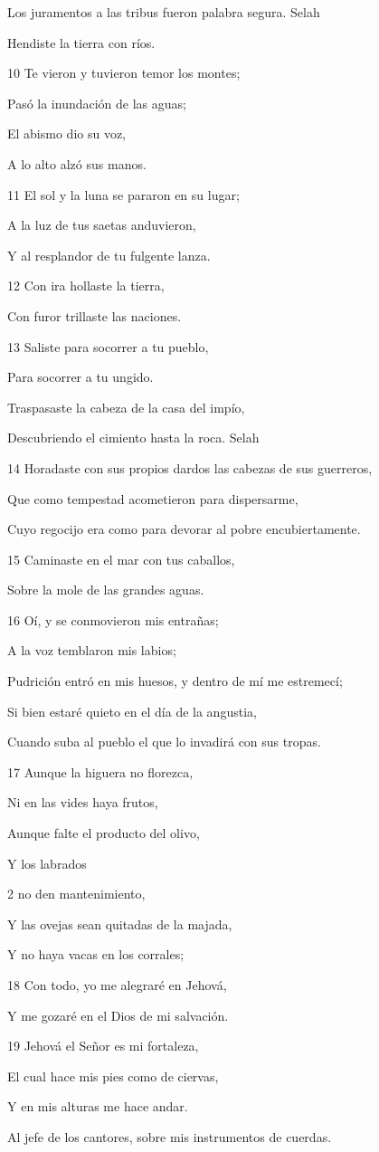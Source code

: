 \par Los juramentos a las tribus fueron palabra segura. Selah
\par Hendiste la tierra con ríos.
\par 10 Te vieron y tuvieron temor los montes;
\par Pasó la inundación de las aguas;
\par El abismo dio su voz,
\par A lo alto alzó sus manos.
\par 11 El sol y la luna se pararon en su lugar;
\par A la luz de tus saetas anduvieron,
\par Y al resplandor de tu fulgente lanza.
\par 12 Con ira hollaste la tierra,
\par Con furor trillaste las naciones.
\par 13 Saliste para socorrer a tu pueblo,
\par Para socorrer a tu ungido.
\par Traspasaste la cabeza de la casa del impío,
\par Descubriendo el cimiento hasta la roca. Selah
\par 14 Horadaste con sus propios dardos las cabezas de sus guerreros,
\par Que como tempestad acometieron para dispersarme,
\par Cuyo regocijo era como para devorar al pobre encubiertamente.
\par 15 Caminaste en el mar con tus caballos,
\par Sobre la mole de las grandes aguas.
\par 16 Oí, y se conmovieron mis entrañas;
\par A la voz temblaron mis labios;
\par Pudrición entró en mis huesos, y dentro de mí me estremecí; 
\par Si bien estaré quieto en el día de la angustia,
\par Cuando suba al pueblo el que lo invadirá con sus tropas.
\par 17 Aunque la higuera no florezca,
\par Ni en las vides haya frutos,
\par Aunque falte el producto del olivo,
\par Y los labrados
\par 2 no den mantenimiento,
\par Y las ovejas sean quitadas de la majada,
\par Y no haya vacas en los corrales;
\par 18 Con todo, yo me alegraré en Jehová,
\par Y me gozaré en el Dios de mi salvación.
\par 19 Jehová el Señor es mi fortaleza,
\par El cual hace mis pies como de ciervas, 
\par Y en mis alturas me hace andar. 
\par Al jefe de los cantores, sobre mis instrumentos de cuerdas.

